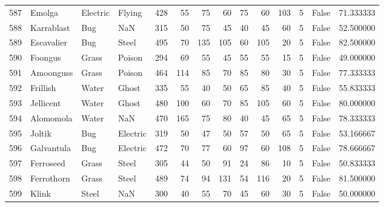 \begin{tabular}{rlllrrrrrrrrlr}
 587 &                     Emolga &  Electric &    Flying &    428 &   55 &      75 &       60 &       75 &       60 &    103 &           5 &      False &   71.333333 \\
 588 &                 Karrablast &       Bug &       NaN &    315 &   50 &      75 &       45 &       40 &       45 &     60 &           5 &      False &   52.500000 \\
 589 &                 Escavalier &       Bug &     Steel &    495 &   70 &     135 &      105 &       60 &      105 &     20 &           5 &      False &   82.500000 \\
 590 &                    Foongus &     Grass &    Poison &    294 &   69 &      55 &       45 &       55 &       55 &     15 &           5 &      False &   49.000000 \\
 591 &                  Amoonguss &     Grass &    Poison &    464 &  114 &      85 &       70 &       85 &       80 &     30 &           5 &      False &   77.333333 \\
 592 &                   Frillish &     Water &     Ghost &    335 &   55 &      40 &       50 &       65 &       85 &     40 &           5 &      False &   55.833333 \\
 593 &                  Jellicent &     Water &     Ghost &    480 &  100 &      60 &       70 &       85 &      105 &     60 &           5 &      False &   80.000000 \\
 594 &                  Alomomola &     Water &       NaN &    470 &  165 &      75 &       80 &       40 &       45 &     65 &           5 &      False &   78.333333 \\
 595 &                     Joltik &       Bug &  Electric &    319 &   50 &      47 &       50 &       57 &       50 &     65 &           5 &      False &   53.166667 \\
 596 &                 Galvantula &       Bug &  Electric &    472 &   70 &      77 &       60 &       97 &       60 &    108 &           5 &      False &   78.666667 \\
 597 &                  Ferroseed &     Grass &     Steel &    305 &   44 &      50 &       91 &       24 &       86 &     10 &           5 &      False &   50.833333 \\
 598 &                 Ferrothorn &     Grass &     Steel &    489 &   74 &      94 &      131 &       54 &      116 &     20 &           5 &      False &   81.500000 \\
 599 &                      Klink &     Steel &       NaN &    300 &   40 &      55 &       70 &       45 &       60 &     30 &           5 &      False &   50.000000 \\

\end{tabular}
